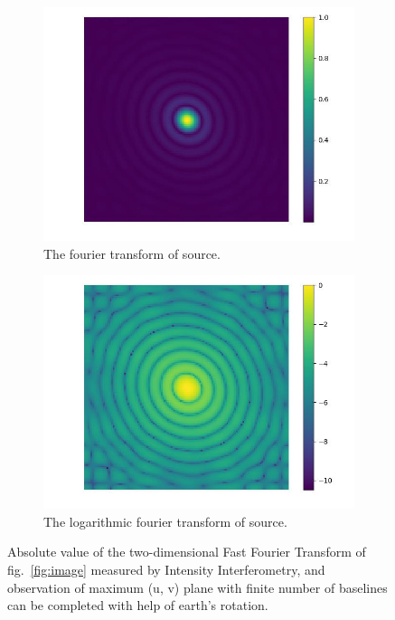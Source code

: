 \begin{figure}
	\centering
	\begin{subfigure}{0.5\linewidth}
		\includegraphics[width=\linewidth]{fig/ft/ft.jpg}
		\caption{The fourier transform of source.}
	\end{subfigure}\hfill
	\begin{subfigure}{0.5\linewidth}
		\includegraphics[width=\linewidth]{fig/ft/ft_log.jpg}
		\caption{The logarithmic fourier transform of source.}
	\end{subfigure}
	\caption{Absolute value of the two-dimensional Fast Fourier Transform of fig.~\ref{fig:image} measured by Intensity Interferometry, and observation of maximum (u, v) plane with finite number of baselines can be completed with help of earth's rotation.}
	\label{fig:ft}
\end{figure}
